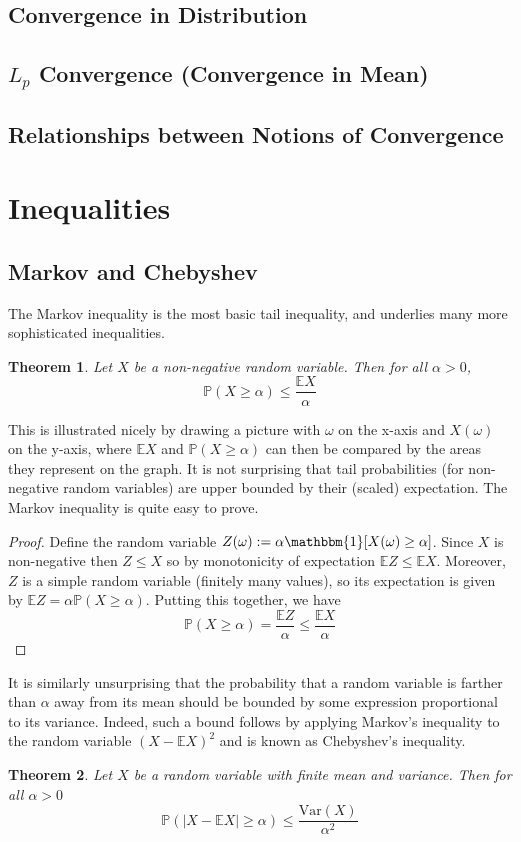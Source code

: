 \documentclass[12pt]{article}
\newcommand*{\abs}[1]{\left\lvert#1\right\rvert}
\newcommand{\E}{\mathbb{E}}
\newcommand{\Var}{\mathrm{Var}}
\newcommand{\Prob}{\mathbb{P}}
\newtheorem{thm}{Theorem}
\begin{document}
\subsection{Convergence in Distribution}

\subsection{$L_p$ Convergence (Convergence in Mean)}

\subsection{Relationships between Notions of Convergence}

\section{Inequalities}

\subsection{Markov and Chebyshev}
The Markov inequality is the most basic tail inequality, and underlies many more sophisticated inequalities. 
\begin{thm}
Let $X$ be a non-negative random variable. Then for all $\alpha > 0$, 
\[\Prob(X \geq \alpha) \leq \frac{\E X}{\alpha}\]
\end{thm}
This is illustrated nicely by drawing a picture with $\omega$ on the x-axis and $X(\omega)$ on the y-axis, where $\E X$ and $\Prob(X \geq \alpha)$ can then be compared by the areas they represent on 
the graph. It is not surprising that tail probabilities (for non-negative random variables) are upper bounded by their (scaled) expectation. The Markov inequality is quite easy to prove. 
\begin{proof} 
Define the random variable $Z(\omega) := \alpha \mathbbm{1}[X(\omega) \geq \alpha]$. Since $X$ is non-negative then $Z \leq X$ so by monotonicity of expectation $\E Z \leq \E X$. Moreover, $Z$ is a simple 
random variable (finitely many values), so its expectation is given by $\E Z = \alpha \Prob(X \geq \alpha)$. Putting this together, we have
\[\Prob(X \geq \alpha) = \frac{\E Z}{\alpha} \leq \frac{\E X}{\alpha} \]
\end{proof}
It is similarly unsurprising that the probability that a random variable is farther than $\alpha$ away from its mean should be bounded by some expression proportional to its variance. Indeed, such a bound follows 
by applying Markov's inequality to the random variable $(X - \E X)^2$ and is known as Chebyshev's inequality. 
\begin{thm}
Let $X$ be a random variable with finite mean and variance. Then for all $\alpha > 0$
\[\Prob(\abs{X - \E X} \geq \alpha) \leq \frac{\Var(X)}{\alpha^2}\]
\end{thm}
\end{document}

